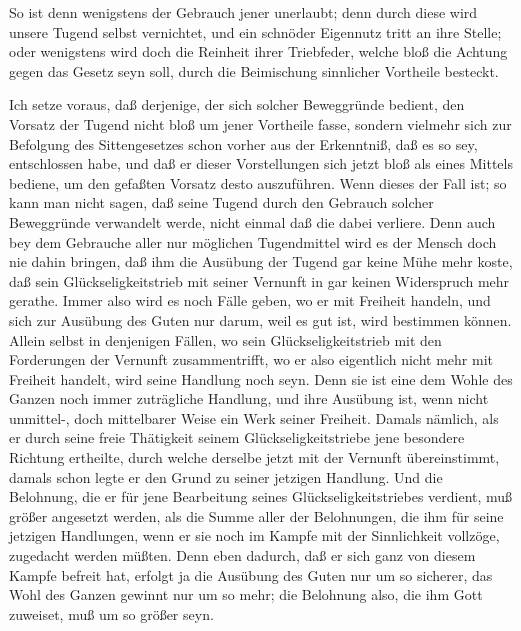  So ist denn wenigstens der Gebrauch jener  unerlaubt; denn durch diese wird unsere Tugend selbst vernichtet, und ein schnöder Eigennutz tritt an ihre Stelle; oder wenigstens wird doch die Reinheit ihrer Triebfeder, welche bloß die Achtung gegen das Gesetz seyn soll, durch die Beimischung sinnlicher Vortheile besteckt.~\par
{} Ich setze voraus, daß derjenige, der sich solcher Beweggründe bedient, den Vorsatz der Tugend nicht bloß um jener Vortheile  fasse, sondern vielmehr sich zur Befolgung des Sittengesetzes schon vorher aus der Erkenntniß, daß es so  sey, entschlossen habe, und daß er dieser Vorstellungen sich jetzt bloß als eines Mittels bediene, um den gefaßten Vorsatz desto  auszuführen. Wenn dieses der Fall ist; so kann man nicht sagen, daß seine Tugend durch den Gebrauch solcher Beweggründe  verwandelt werde, nicht einmal daß die  dabei verliere. Denn auch bey dem Gebrauche aller nur möglichen Tugendmittel wird es der Mensch doch nie dahin bringen, daß ihm die Ausübung der Tugend gar keine Mühe mehr koste, daß sein Glückseligkeitstrieb mit seiner Vernunft in gar keinen Widerspruch mehr gerathe. Immer also wird es noch Fälle geben, wo er mit Freiheit handeln, und sich zur Ausübung des Guten nur darum, weil es gut ist, wird bestimmen können. Allein selbst in denjenigen Fällen, wo sein Glückseligkeitstrieb mit den Forderungen der Vernunft zusammentrifft, wo er also eigentlich nicht mehr mit Freiheit handelt, wird seine Handlung noch  seyn. Denn sie ist eine dem Wohle des Ganzen noch immer zuträgliche Handlung, und ihre Ausübung ist, wenn nicht unmittel-, doch mittelbarer Weise ein Werk seiner Freiheit. Damals nämlich, als er durch seine freie Thätigkeit seinem Glückseligkeitstriebe jene besondere Richtung ertheilte, durch welche derselbe jetzt mit der Vernunft übereinstimmt, damals schon legte er den Grund zu seiner jetzigen Handlung. Und die Belohnung, die er für jene Bearbeitung seines Glückseligkeitstriebes verdient, muß größer angesetzt werden, als die Summe aller der Belohnungen, die ihm für seine jetzigen Handlungen, wenn er sie noch im Kampfe mit der Sinnlichkeit vollzöge, zugedacht werden müßten. Denn eben dadurch, daß er sich ganz von diesem Kampfe befreit hat, erfolgt ja die Ausübung des Guten nur um so sicherer, das Wohl des Ganzen gewinnt nur um so mehr; die Belohnung also, die ihm Gott zuweiset, muß um so größer seyn.\par
